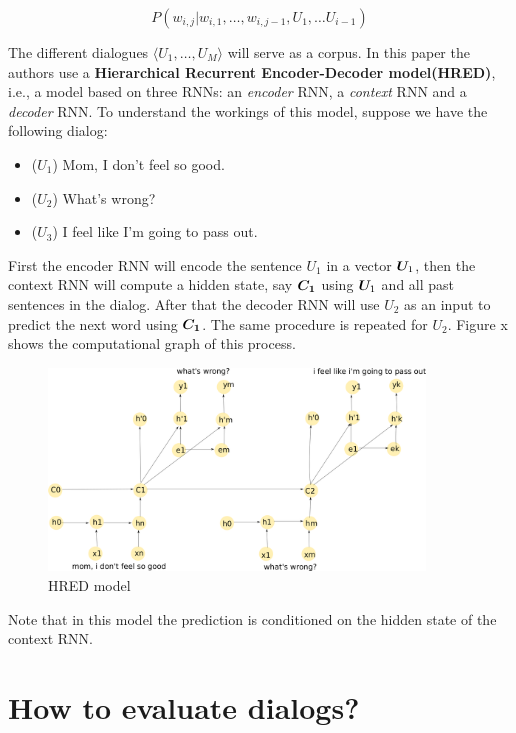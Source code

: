 \begin{equation}
P(w_{i,j} | w_{i,1}, \dots , w_{i,j-1}, U_{1}, \dots U_{i-1})
\end{equation}

The different dialogues $\langle U_1 , \dots, U_M \rangle$ will serve as a corpus.
In this paper the authors use a \textbf{Hierarchical Recurrent Encoder-Decoder model(HRED)}, i.e., a model based on three RNNs: an \textit{encoder} RNN, a \textit{context} RNN and a \textit{decoder} RNN.  To understand the workings of this model, suppose we have the following dialog:
\begin{itemize}
\item ($U_1$) Mom, I don't feel so good.\\
\item ($U_2$) What's wrong?\\
\item ($U_3$) I feel like I'm going to pass out.
\end{itemize}

First the encoder RNN will encode the sentence $U_1$ in a vector $\bm{U}_1$, then the context RNN will compute a hidden state, say $\bm{C_1}$ using $\bm{U}_1$ and all past sentences in the dialog. After that the decoder RNN will use $U_2$ as an input to predict the next word using $\bm{C_1}$. The same procedure is repeated for $U_2$. Figure
x shows the computational graph of this process.

\begin{figure}[ht!]
\label{HRED}
\includegraphics[width=10cm]{img/HRED_placeholder.png}
\caption{HRED model}
\end{figure}

Note that in this model the prediction is conditioned on the hidden state of the context RNN.



\section{How to evaluate dialogs?}
\label{ch:03-eval}

